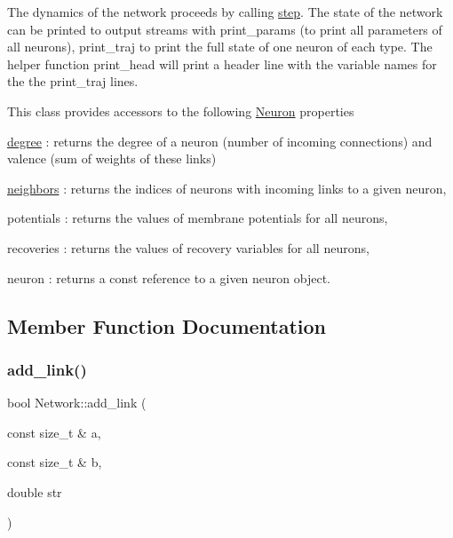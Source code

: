 The dynamics of the network proceeds by calling \hyperlink{classNetwork_a53665a3a69e6ec894c313d0ce3fb7f34}{step}. The state of the network can be printed to output streams with print\+\_\+params (to print all parameters of all neurons), print\+\_\+traj to print the full state of one neuron of each type. The helper function print\+\_\+head will print a header line with the variable names for the the print\+\_\+traj lines.

This class provides accessors to the following \hyperlink{classNeuron}{Neuron} properties
\begin{DoxyItemize}
\item \hyperlink{classNetwork_a313da14a6a430ae14e3943dba78edb61}{degree} \+: returns the degree of a neuron (number of incoming connections) and valence (sum of weights of these links)
\item \hyperlink{classNetwork_a98bbf44b077ba1bec5a62ecffc405503}{neighbors} \+: returns the indices of neurons with incoming links to a given neuron,
\item potentials \+: returns the values of membrane potentials for all neurons,
\item recoveries \+: returns the values of recovery variables for all neurons,
\item neuron \+: returns a const reference to a given neuron object. 
\end{DoxyItemize}

\subsection{Member Function Documentation}
\mbox{\label{classNetwork_a6ebe0899329973e4924997a25e205856}} 
\subsubsection{\texorpdfstring{add\+\_\+link()}{add\_link()}}
{\footnotesize\ttfamily bool Network\+::add\+\_\+link (\begin{DoxyParamCaption}\item[{const size\+\_\+t \&}]{a,  }\item[{const size\+\_\+t \&}]{b,  }\item[{double}]{str }\end{DoxyParamCaption})}


